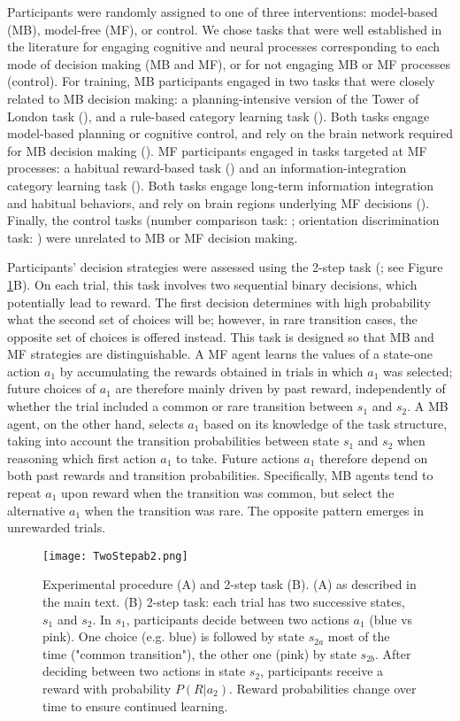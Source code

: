 \documentclass[11pt]{article} %
\begin{document}
Participants were randomly assigned to one of three interventions: model-based (MB), model-free (MF), or control. We chose tasks that were well established in the literature for engaging cognitive and neural processes corresponding to each mode of decision making (MB and MF), or for not engaging MB or MF processes (control). For training, MB participants engaged in two tasks that were closely related to MB decision making: a planning-intensive version of the Tower of London task (\cite{beauchamp_dynamic_2003}), and a rule-based category learning task (\cite{maddox_dissociating_2004}). Both tasks engage model-based planning or cognitive control, and rely on the brain network required for MB decision making (\cite{dolan_goals_2013}). MF participants engaged in tasks targeted at MF processes: a habitual reward-based task (\cite{tricomi_value_2015}) and an information-integration category learning task (\cite{maddox_dissociating_2004}). Both tasks engage long-term information integration and habitual behaviors, and rely on brain regions underlying MF decisions (\cite{dolan_goals_2013}). Finally, the control tasks (number comparison task: \cite{piazza_neurocognitive_2010}; orientation discrimination task: \cite{sasaki_advances_2010}) were unrelated to MB or MF decision making. 

Participants' decision strategies were assessed using the 2-step task (\cite{daw_model-based_2011}; see Figure \ref{TwoStep}B). On each trial, this task involves two sequential binary decisions, which potentially lead to reward. The first decision determines with high probability what the second set of choices will be; however, in rare transition cases, the opposite set of choices is offered instead. This task is designed so that MB and MF strategies are distinguishable. A MF agent learns the values of a state-one action $a_{1}$ by accumulating the rewards obtained in trials in which $a_{1}$ was selected; future choices of $a_{1}$ are therefore mainly driven by past reward, independently of whether the trial included a common or rare transition between $s_{1}$ and $s_{2}$. A MB agent, on the other hand, selects $a_{1}$ based on its knowledge of the task structure, taking into account the transition probabilities between state $s_{1}$ and $s_{2}$ when reasoning which first action $a_{1}$ to take. Future actions $a_{1}$ therefore depend on both past rewards and transition probabilities. Specifically, MB agents tend to repeat $a_{1}$ upon reward when the transition was common, but select the alternative $a_{1}$ when the transition was rare. The opposite pattern emerges in unrewarded trials.
%
\begin{figure}
	\texttt{[image: TwoStepab2.png]}
	\caption{Experimental procedure (A) and 2-step task (B). (A) as described in the main text. (B) 2-step task: each trial has two successive states, $s_{1}$ and $s_{2}$. In $s_{1}$, participants decide between two actions $a_{1}$ (blue vs pink). One choice (e.g. blue) is followed by state $s_{2a}$ most of the time ("common transition"), the other one (pink) by state $s_{2b}$. After deciding between two actions in state $s_{2}$, participants receive a reward with probability $P(R|a_{2})$. Reward probabilities change over time to ensure continued learning.}
	\label{TwoStep}
\end{figure}
%
\end{document}
